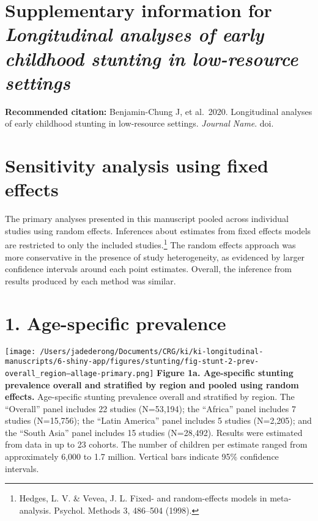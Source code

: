 \documentclass[9pt,]{article}
\title{}
\author{}
\date{}
\let\rmarkdownfootnote\footnote%
\def\footnote{\protect\rmarkdownfootnote}
\begin{document}
\hypertarget{supplementary-information-for-longitudinal-analyses-of-early-childhood-stunting-in-low-resource-settings}{%
\section{\texorpdfstring{Supplementary information for
\emph{Longitudinal analyses of early childhood stunting in low-resource
settings}}{Supplementary information for Longitudinal analyses of early childhood stunting in low-resource settings}}\label{supplementary-information-for-longitudinal-analyses-of-early-childhood-stunting-in-low-resource-settings}}

\raggedright

\textbf{Recommended citation:} Benjamin-Chung J, et al.~2020.
Longitudinal analyses of early childhood stunting in low-resource
settings. \emph{Journal Name}. doi.

\hypertarget{sensitivity-analysis-using-fixed-effects}{%
\section{Sensitivity analysis using fixed
effects}\label{sensitivity-analysis-using-fixed-effects}}

The primary analyses presented in this manuscript pooled across
individual studies using random effects. Inferences about estimates from
fixed effects models are restricted to only the included
studies.\footnote{Hedges, L. V. \& Vevea, J. L. Fixed- and
  random-effects models in meta-analysis. Psychol. Methods 3, 486--504
  (1998).} The random effects approach was more conservative in the
presence of study heterogeneity, as evidenced by larger confidence
intervals around each point estimates. Overall, the inference from
results produced by each method was similar.

\hypertarget{age-specific-prevalence}{%
\section{1. Age-specific prevalence}\label{age-specific-prevalence}}

\texttt{[image: /Users/jadederong/Documents/CRG/ki/ki-longitudinal-manuscripts/6-shiny-app/figures/stunting/fig-stunt-2-prev-overall\_region--allage-primary.png]}
\textbf{Figure 1a. Age-specific stunting prevalence overall and
stratified by region and pooled using random effects. } Age-specific
stunting prevalence overall and stratified by region. The ``Overall''
panel includes 22 studies (N=53,194); the ``Africa'' panel includes 7
studies (N=15,756); the ``Latin America'' panel includes 5 studies
(N=2,205); and the ``South Asia'' panel includes 15 studies (N=28,492).
Results were estimated from data in up to 23 cohorts. The number of
children per estimate ranged from approximately 6,000 to 1.7 million.
Vertical bars indicate 95\% confidence intervals.
\end{document}
